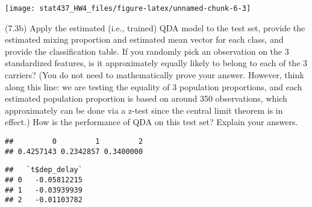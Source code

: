 \documentclass[
  11pt,
]{article}
\newenvironment{Shaded}{\begin{snugshade}}{\end{snugshade}}
\newcommand{\CommentTok}[1]{\textcolor[rgb]{0.56,0.35,0.01}{\textit{#1}}}
\newcommand{\FunctionTok}[1]{\textcolor[rgb]{0.00,0.00,0.00}{#1}}
\newcommand{\NormalTok}[1]{#1}
\newcommand{\OtherTok}[1]{\textcolor[rgb]{0.56,0.35,0.01}{#1}}
\newcommand{\SpecialCharTok}[1]{\textcolor[rgb]{0.00,0.00,0.00}{#1}}
\begin{document}
\begin{center}\texttt{[image: stat437\_HW4\_files/figure-latex/unnamed-chunk-6-3]} \end{center}

(7.3b) Apply the estimated (i.e., trained) QDA model to the test set,
provide the estimated mixing proportion and estimated mean vector for
each class, and provide the classification table. If you randomly pick
an observation on the 3 standardized features, is it approximately
equally likely to belong to each of the 3 carriers? (You do not need to
mathematically prove your answer. However, think along this line: we are
testing the equality of 3 population proportions, and each estimated
population proportion is based on around 350 observations, which
approximately can be done via a z-test since the central limit theorem
is in effect.) How is the performance of QDA on this test set? Explain
your answers.

\begin{Shaded}
\end{Shaded}

\begin{verbatim}
##         0         1         2 
## 0.4257143 0.2342857 0.3400000
\end{verbatim}

\begin{Shaded}
\end{Shaded}

\begin{verbatim}
##   `t$dep_delay`
## 0   -0.05812215
## 1   -0.03939939
## 2   -0.01103782
\end{verbatim}

\begin{Shaded}
\end{Shaded}
\end{document}

